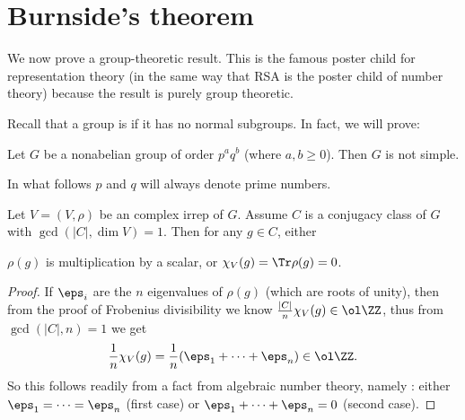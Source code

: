 \section{Burnside's theorem}
We now prove a group-theoretic result.
This is the famous poster child for representation theory
(in the same way that RSA is the poster child of number theory)
because the result is purely group theoretic.

Recall that a group is  if it has no normal subgroups.
In fact, we will prove:
\begin{theorem}[Burnside]
	Let $G$ be a nonabelian group of order $p^a q^b$ (where $a,b \ge 0$).
	Then $G$ is not simple.
\end{theorem}
In what follows $p$ and $q$ will always denote prime numbers.

\begin{lemma}[On $\gcd(|C|, \dim V) = 1$]
	\label{lem:burnside_ant_lemma}
	Let $V = (V, \rho)$ be an complex irrep of $G$.
	Assume $C$ is a conjugacy class of $G$ with $\gcd(|C|, \dim V) = 1$.
	Then for any $g \in C$, either
	\begin{itemize}
		\ii $\rho(g)$ is multiplication by a scalar, or
		\ii $\chi_V(g) = \Tr \rho(g) = 0$.
	\end{itemize}
\end{lemma}
\begin{proof}
	If $\eps_i$ are the $n$ eigenvalues of $\rho(g)$ (which are roots of unity),
	then from the proof of Frobenius divisibility we know
	$\frac{|C|}{n} \chi_V(g) \in \ol\ZZ$,
	thus from $\gcd(|C|, n) = 1$ we get 
	\[ \frac1n \chi_V(g) = \frac1n(\eps_1 + \dots + \eps_n) \in \ol\ZZ. \]
	So this follows readily from a fact from algebraic number theory,
	namely :
	either $\eps_1 = \dots = \eps_n$ (first case) or
	$\eps_1 + \dots + \eps_n = 0$ (second case).
\end{proof}

